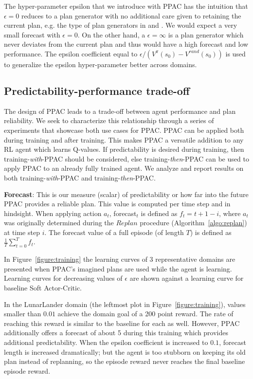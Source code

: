 \documentclass{article}
\begin{document}
            The hyper-parameter epsilon that we introduce with PPAC has the intuition that $\epsilon=0$ reduces to a plan generator with no additional care given to retaining the current plan, e.g. the type of plan generators in \cite{racaniere2017imagination} and \cite{kim2020communication}. We would expect a very small forecast with $\epsilon=0$. On the other hand, a $\epsilon=\infty$ is a plan generator which never deviates from the current plan and thus would have a high forecast and low performance. The epsilon coefficient equal to $\epsilon / (V^{\pi}(s_0)-V^{rand}(s_0))$ is used to generalize the epsilon hyper-parameter better across domains.



        \subsection{Predictability-performance trade-off}
            The design of PPAC leads to a trade-off between agent performance and plan reliability. We seek to characterize this relationship through a series of experiments that showcase both use cases for PPAC. PPAC can be applied both during training and after training. This makes PPAC a versatile addition to any RL agent which learns Q-values. If predictability is desired during training, then training-\textit{with}-PPAC should be considered, else training-\textit{then}-PPAC can be used to apply PPAC to an already fully trained agent. We analyze and report results on both training-\textit{with}-PPAC and training-\textit{then}-PPAC.

            \textbf{Forecast}: This is our measure (scalar) of predictability or how far into the future PPAC provides a reliable plan. This value is computed per time step and in hindsight. When applying action $a_t$, forecast$_t$ is defined as $f_t=t+1-i$, where $a_t$ was originally determined during the $Replan$ procedure (Algorithm~\ref{algo:replan}) at time step $i$. The forecast value of a full episode (of length $T$) is defined as $\frac{1}{T}\sum_{t=0}^Tf_t$.

            In Figure~\ref{figure:training} the learning curves of 3 representative domains are presented when PPAC's imagined plans are used while the agent is learning. Learning curves for decreasing values of $\epsilon$ are shown against a learning curve for baseline Soft Actor-Critic.

            In the LunarLander domain (the leftmost plot in Figure~\ref{figure:training}), values smaller than $0.01$ achieve the domain goal of a 200 point reward. The rate of reaching this reward is similar to the baseline for each as well. However, PPAC additionally offers a forecast of about 5 during this training which provides additional predictability. When the epsilon coefficient is increased to $0.1$, forecast length is increased dramatically; but the agent is too stubborn on keeping its old plan instead of replanning, so the episode reward never reaches the final baseline episode reward.
\end{document}
